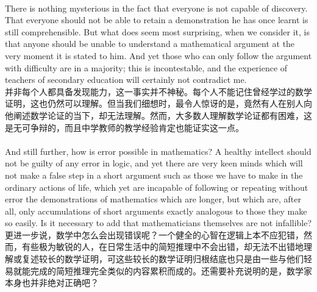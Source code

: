 \documentclass{article}
\begin{document}
\\
There is nothing mysterious in the fact that everyone is not capable of discovery. That everyone should not be able to retain a demonstration he has once learnt is still comprehensible. But what does seem most surprising, when we consider it, is that anyone should be unable to understand a mathematical argument at the very moment it is stated to him. And yet those who can only follow the argument with difficulty are in a majority; this is incontestable, and the experience of teachers of secondary education will certainly not contradict me.\\
并非每个人都具备发现能力，这一事实并不神秘。每个人不能记住曾经学过的数学证明，这也仍然可以理解。但当我们细想时，最令人惊讶的是，竟然有人在别人向他阐述数学论证的当下，却无法理解。然而，大多数人理解数学论证都有困难，这是无可争辩的，而且中学教师的教学经验肯定也能证实这一点。 \\

\\
And still further, how is error possible in mathematics? A healthy intellect should not be guilty of any error in logic, and yet there are very keen minds which will not make a false step in a short argument such as those we have to make in the ordinary actions of life, which yet are incapable of following or repeating without error the demonstrations of mathematics which are longer, but which are, after all, only accumulations of short arguments exactly analogous to those they make so easily. Is it necessary to add that mathematicians themselves are not infallible?\\
更进一步说，数学中怎么会出现错误呢？一个健全的心智在逻辑上本不应犯错，然而，有些极为敏锐的人，在日常生活中的简短推理中不会出错，却无法不出错地理解或复述较长的数学证明，可这些较长的数学证明归根结底也只是由一些与他们轻易就能完成的简短推理完全类似的内容累积而成的。还需要补充说明的是，数学家本身也并非绝对正确吧？\\ 
\end{document}
